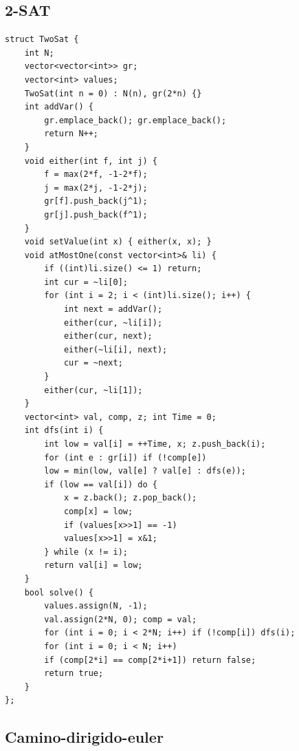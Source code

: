 \documentclass[10pt,a4paper,twocolumn]{article}
\begin{document}
\subsection{2-SAT}

\begin{lstlisting}[style=cpp, title={2-SAT.cpp}]
struct TwoSat {
	int N;
	vector<vector<int>> gr;
	vector<int> values;
	TwoSat(int n = 0) : N(n), gr(2*n) {}
	int addVar() {
		gr.emplace_back(); gr.emplace_back();
		return N++;
	}
	void either(int f, int j) {
		f = max(2*f, -1-2*f);
		j = max(2*j, -1-2*j);
		gr[f].push_back(j^1);
		gr[j].push_back(f^1);
	}
	void setValue(int x) { either(x, x); }
	void atMostOne(const vector<int>& li) {
		if ((int)li.size() <= 1) return;
		int cur = ~li[0];
		for (int i = 2; i < (int)li.size(); i++) {
			int next = addVar();
			either(cur, ~li[i]);
			either(cur, next);
			either(~li[i], next);
			cur = ~next;
		}
		either(cur, ~li[1]);
	}
	vector<int> val, comp, z; int Time = 0;
	int dfs(int i) {
		int low = val[i] = ++Time, x; z.push_back(i);
		for (int e : gr[i]) if (!comp[e])
		low = min(low, val[e] ? val[e] : dfs(e));
		if (low == val[i]) do {
			x = z.back(); z.pop_back();
			comp[x] = low;
			if (values[x>>1] == -1)
			values[x>>1] = x&1;
		} while (x != i);
		return val[i] = low;
	}
	bool solve() {
		values.assign(N, -1);
		val.assign(2*N, 0); comp = val;
		for (int i = 0; i < 2*N; i++) if (!comp[i]) dfs(i);
		for (int i = 0; i < N; i++)
		if (comp[2*i] == comp[2*i+1]) return false;
		return true;
	}
};
\end{lstlisting}

\subsection{Camino-dirigido-euler}
\end{document}
